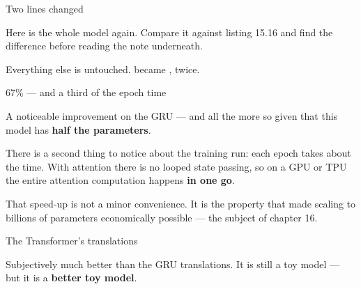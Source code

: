 \documentclass[aspectratio=169,11pt,t]{beamer}
\begin{document}
\begin{frame}[shrink=25]{Two lines changed}
{\fontsize{9.4}{12.6}\selectfont\color{fg2}Here is the whole model again. Compare it against listing 15.16 and find the difference before reading the note underneath.\par}\vskip 4pt
{\fontsize{9.4}{12.6}\selectfont\color{fg2}Everything else is untouched.  became , twice.\par}\vskip 4pt
\end{frame}

\begin{frame}[shrink=25]{67\% --- and a third of the epoch time}
\begin{minipage}[t]{0.3253\textwidth}
\end{minipage}%
\hfill
\begin{minipage}[t]{0.3253\textwidth}
\end{minipage}%
\hfill
\begin{minipage}[t]{0.3253\textwidth}
\end{minipage}%
{\fontsize{9.4}{12.6}\selectfont\color{fg2}A noticeable improvement on the GRU --- and all the more so given that this model has \textbf{half the parameters}.\par}\vskip 4pt
{\fontsize{9.4}{12.6}\selectfont\color{fg2}There is a second thing to notice about the training run: each epoch takes about  the time. With attention there is no looped state passing, so on a GPU or TPU the entire attention computation happens \textbf{in one go}.\par}\vskip 4pt
\begin{iband}[signal]
That speed-up is not a minor convenience. It is the property that made scaling to billions of parameters economically possible --- the subject of chapter 16.
\end{iband}
\end{frame}

\begin{frame}[shrink=25]{The Transformer's translations}
{\fontsize{9.4}{12.6}\selectfont\color{fg2}Subjectively much better than the GRU translations. It is still a toy model --- but it is a \textbf{better toy model}.\par}\vskip 4pt
\end{frame}
\end{document}
